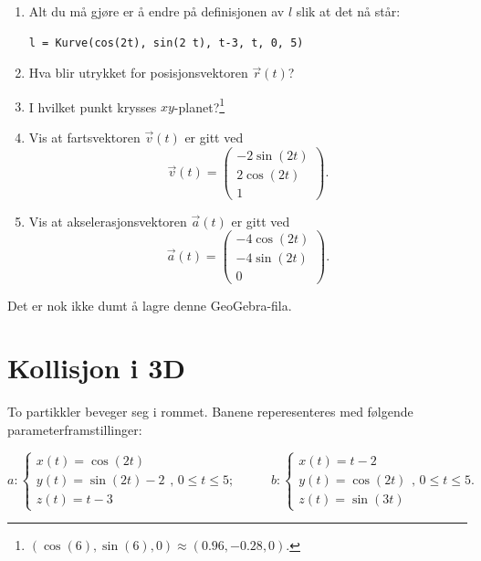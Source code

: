 \documentclass[a4paper,12pt]{article}
\begin{document}
\begin{enumerate}[label=\alph*)]
\item Alt du må gjøre er å endre på definisjonen av $l$ slik at det nå står:
\begin{lstlisting}
l = Kurve(cos(2t), sin(2 t), t-3, t, 0, 5)
\end{lstlisting}

\item Hva blir utrykket for posisjonsvektoren $\vec r(t)$?
\item I hvilket punkt krysses $xy$-planet?\footnote{$(\cos(6),\sin(6),0) \approx (0.96,-0.28,0)$.}
\item Vis at fartsvektoren $\vec v(t)$ er gitt ved
\[
\vec v(t) =
\begin{pmatrix}
-2\sin(2t) \\
2\cos(2t) \\
1
\end{pmatrix}.
\]
\item Vis at akselerasjonsvektoren $\vec a(t)$ er gitt ved
\[
\vec a(t) =
\begin{pmatrix}
-4\cos(2t) \\
-4\sin(2t) \\
0
\end{pmatrix}.
\]

\end{enumerate}
Det er nok ikke dumt å lagre denne GeoGebra-fila.

\section*{Kollisjon i 3D}

To partikkler beveger seg i rommet. Banene reperesenteres med følgende parameterframstillinger:

\[
a:
\begin{cases}
x(t)=\cos(2t) \\
y(t)=\sin(2t)-2 \\
z(t)=t-3
\end{cases},\, 0 \leq t \leq 5; \,\,\,\,\,\,\,\,\,\,\,\,\,\,\,\,\, b:
\begin{cases}
x(t)=t-2 \\
y(t)=\cos(2t) \\
z(t)=\sin(3t)
\end{cases},\, 0 \leq t \leq 5.
\]
\end{document}
